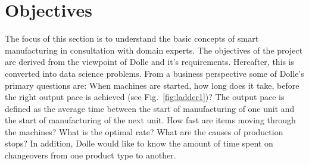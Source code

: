 \documentclass[runningheads]{llncs}
\begin{document}
\section{Objectives}
\label{sec:businessunderstanding}
\iffalse
\begin{wrapfigure}{r}{0.4\textwidth}
  \begin{center}
    \texttt{[image: machine1]}
  \end{center}
  \vspace{-3mm}
  \caption{Three-section timber loft ladder at Dolle's assembly line}
  \label{fig:ladder1}
\end{wrapfigure}
\fi

\iffalse
The focus of this section is to understand the basic concepts of smart manufacturing in consultation with domain experts. Project objectives are derived from the viewpoint of Dolle requirements and subsequently converted into data science problem definitions. Some of Dolle's primary objectives, from a business perspective are described as follow. When machines are started, Dolle would like to know how long it takes, before the right output pace with regards to the product (ladder) manufactured is achieved (see Fig.~\ref{fig:ladder1}). Output rate is the average time between the start of production of one unit and the start of production of the next unit. How fast are items moving through the machines? What is optimal rate? In addition, What are the causes of production disruption? Dolle would also like to know how much time is spent on changeovers (product types). A business goal states objectives in business terms, whereas, a data mining goal states objectives in technical terms. A non-exhaustive list of data mining goals:
\fi
The focus of this section is to understand the basic concepts of smart manufacturing in consultation with domain experts. The objectives of the project are derived from the viewpoint of Dolle and it's requirements. Hereafter, this is converted into data science problems. From a business perspective some of Dolle's primary questions are: When machines are started, how long does it take, before the right output pace is achieved (see Fig.~\ref{fig:ladder1})? The output pace is defined as the average time between the start of manufacturing of one unit and the start of manufacturing of the next unit. How fast are items moving through the machines? What is the optimal rate? What are the causes of production stops? In addition, Dolle would like to know the amount of time spent on changeovers from one product type to another. 
\end{document}
